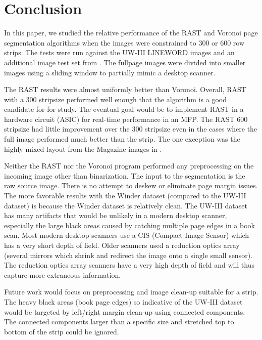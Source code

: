 \documentclass[conference]{IEEEtran}
\begin{document}
\section{Conclusion}

In this paper, we studied the relative performance of the RAST and Voronoi page
segmentation algorithms when the images were constrained to 300 or 600 row
strips. The tests were run against the UW-III LINEWORD images and an additional
image test set from \cite{winder2010extending}. The fullpage images were divided
into smaller images using a sliding window to partially mimic a desktop
scanner.

The RAST results were almost uniformly better than Voronoi. 
Overall, RAST with a 300 stripsize performed well enough that the algorithm is
a good candidate for for study. The eventual goal would be to implement RAST in
a hardware circuit (ASIC) for real-time performance in an MFP.
The RAST 600 stripsize had little improvement over the 300 stripsize even in the cases where
the full image performed much better than the strip. The one exception was the
highly mixed layout from the Magazine images in \cite{winder2010extending}.


Neither the RAST nor the Voronoi program performed any preprocessing on the incoming
image other than binarization. The input to the segmentation is the raw source
image. There is no attempt to deskew or eliminate page margin issues. The more
favorable results with the Winder dataset (compared to the UW-III dataset) is
because the Winder dataset is relatively clean. The UW-III dataset has many
artifacts that would be unlikely in a modern desktop scanner, especially the
large black areas caused by catching multiple page edges in a book scan. Most
modern desktop scanners use a CIS (Compact Image Sensor) which has a very short
depth of field. Older scanners used a reduction optics array (several mirrors
which shrink and redirect the image onto a single small sensor). The
reduction optics array scanners have a very high depth of field and will thus
capture more extraneous information.

Future work would focus on preprocessing and image clean-up suitable for a
strip. The heavy black areas (book page edges) so indicative of the UW-III
dataset would be targeted by left/right margin clean-up using connected
components. The connected components larger than a specific size and 
stretched top to bottom of the strip could be ignored.

\end{document}
